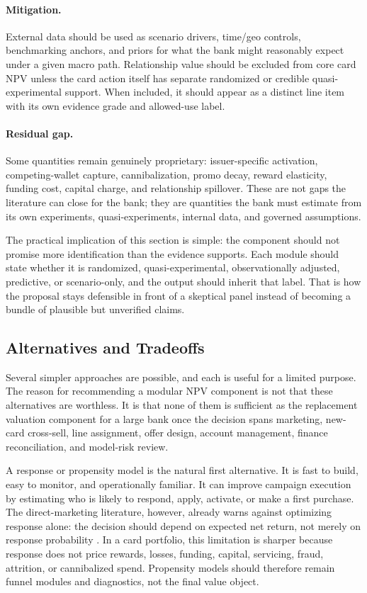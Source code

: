 \documentclass[11pt]{article}
\newcommand{\1}{\mathbf{1}}
\begin{document}
\paragraph{Mitigation.}
External data should be used as scenario drivers, time/geo controls,
benchmarking anchors, and priors for what the bank might reasonably expect
under a given macro path. Relationship value should be excluded from core
card NPV unless the card action itself has separate randomized or credible
quasi-experimental support. When included, it should appear as a distinct line
item with its own evidence grade and allowed-use label.

\paragraph{Residual gap.}
Some quantities remain genuinely proprietary: issuer-specific activation,
competing-wallet capture, cannibalization, promo decay, reward elasticity,
funding cost, capital charge, and relationship spillover. These are not gaps
the literature can close for the bank; they are quantities the bank must
estimate from its own experiments, quasi-experiments, internal data, and
governed assumptions.

The practical implication of this section is simple: the component should not
promise more identification than the evidence supports. Each module should
state whether it is randomized, quasi-experimental, observationally adjusted,
predictive, or scenario-only, and the output should inherit that label. That
is how the proposal stays defensible in front of a skeptical panel instead of
becoming a bundle of plausible but unverified claims.

\subsection{Alternatives and Tradeoffs}
\label{sec:alternatives-tradeoffs}

Several simpler approaches are possible, and each is useful for a limited
purpose. The reason for recommending a modular NPV component is not that these
alternatives are worthless. It is that none of them is sufficient as the
replacement valuation component for a large bank once the decision spans
marketing, new-card cross-sell, line assignment, offer design, account
management, finance reconciliation, and model-risk review.

A response or propensity model is the natural first alternative. It is fast to
build, easy to monitor, and operationally familiar. It can improve campaign
execution by estimating who is likely to respond, apply, activate, or make a
first purchase. The direct-marketing literature, however, already warns against
optimizing response alone: the decision should depend on expected net return,
not merely on response probability \citep{bult1995directmail}. In a card
portfolio, this limitation is sharper because response does not price rewards,
losses, funding, capital, servicing, fraud, attrition, or cannibalized spend.
Propensity models should therefore remain funnel modules and diagnostics, not
the final value object.
\end{document}

